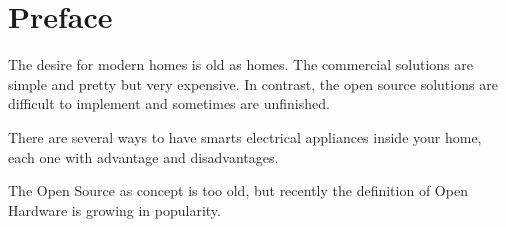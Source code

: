 
\section*{Preface}
The desire for modern homes is old as homes.
The commercial solutions are simple and pretty but very expensive. In contrast,
the open source solutions are difficult to implement and sometimes are
unfinished.

There are several ways to have smarts electrical appliances inside your home, each one
with advantage and disadvantages.

The Open Source as concept is too old, but recently the definition of Open
Hardware is growing in popularity.

